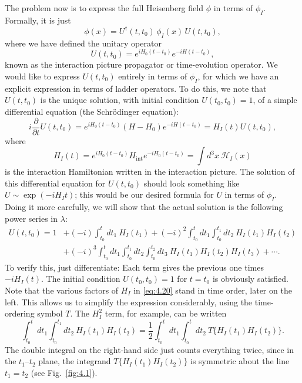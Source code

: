 The problem now is to express the full Heisenberg field $\phi$ in terms of
$\phi_I$.  Formally, it is just
\begin{equation}
  \phi(x) = U^{\dagger}(t, t_0)\,\phi_I(x)\,U(t, t_0),
  \label{eq:4.16}
\end{equation}
where we have defined the unitary operator
\begin{equation}
  U(t, t_0) = e^{iH_0(t-t_0)}e^{-iH(t-t_0)},
  \label{eq:4.17}
\end{equation}
known as the interaction picture propagator or time-evolution operator.  We
would like to express $U(t, t_0)$ entirely in terms of $\phi_I$, for which we
have an explicit expression in terms of ladder operators.  To do this, we
note that $U(t, t_0)$ is the unique solution, with initial condition
$U(t_0, t_0) = 1$, of a simple differential equation (the Schr\"odinger
equation):
\begin{equation}
  i\frac{\partial}{\partial t}U(t, t_0)
    = e^{iH_0(t-t_0)}(H-H_0)e^{-iH(t-t_0)}
    = H_I(t)U(t, t_0),
  \label{eq:4.18}
\end{equation}
where
\begin{equation}
  H_I(t) = e^{iH_0(t-t_0)}H_{\mathrm{int}}e^{-iH_0(t-t_0)}
  = \int d^3x\ \mathcal{H}_I(x)
  \label{eq:4.19}
\end{equation}
is the interaction Hamiltonian written in the interaction picture.  The
solution of this differential equation for $U(t, t_0)$ should look something
like $U \sim \exp(-iH_It)$; this would be our desired formula for $U$ in
terms of $\phi_I$.  Doing it more carefully, we will show that the actual
solution is the following power series in $\lambda$:
\begin{equation}
  \begin{aligned}
    U(t, t_0) = 1 &+ (-i)\int_{t_0}^{t}dt_1\ H_I(t_1)
      + (-i)^2\int_{t_0}^{t}dt_1\int_{t_0}^{t_1}dt_2\ H_I(t_1)H_I(t_2)\\
    &+ (-i)^3\int_{t_0}^{t}dt_1\int_{t_0}^{t_1}dt_2\int_{t_0}^{t_2}dt_3\
      H_I(t_1)H_I(t_2)H_I(t_3) + \cdots .
  \end{aligned}
  \label{eq:4.20}
\end{equation}
To verify this, just differentiate: Each term gives the previous one times
$-iH_I(t)$.  The initial condition $U(t_0, t_0) = 1$ for $t=t_0$ is obviously
satisfied.  Note that the various factors of $H_I$ in \eqref{eq:4.20} stand
in time order, later on the left.  This allows us to simplify the expression
considerably, using the time-ordering symbol $T$.  The $H_I^2$ term, for
example, can be written
\begin{equation}
  \int_{t_0}^{t}dt_1\int_{t_0}^{t_1}dt_2\ H_I(t_1)H_I(t_2)
    = \frac{1}{2}\int_{t_0}^{t}dt_1\int_{t_0}^{t}dt_2\
      T\{H_I(t_1)H_I(t_2)\} .
  \label{eq:4.21}
\end{equation}
The double integral on the right-hand side just counts everything twice,
since in the $t_1$--$t_2$ plane, the integrand $T\{H_I(t_1)H_I(t_2)\}$ is
symmetric about the line $t_1 = t_2$ (see Fig.~\ref{fig:4.1}).

